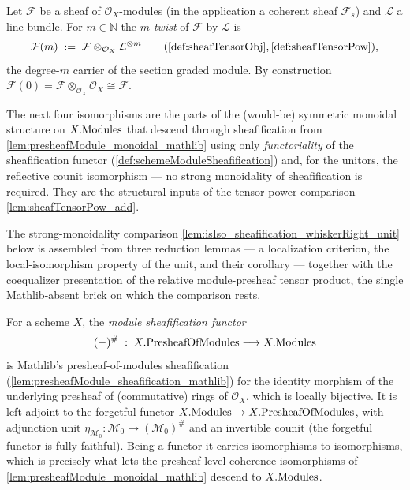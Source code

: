 \begin{definition}
  \label{def:sheafModuleTwist}
  Let \(\mathcal{F}\) be a sheaf of \(\mathcal{O}_X\)-modules (in the application
  a coherent sheaf \(\mathcal{F}_s\)) and \(\mathcal{L}\) a line bundle. For
  \(m \in \mathbb{N}\) the \emph{\(m\)-twist} of \(\mathcal{F}\) by
  \(\mathcal{L}\) is
  \[
    \mathcal{F}(m) \;:=\;
      \mathcal{F} \otimes_{\mathcal{O}_X} \mathcal{L}^{\otimes m}
      \qquad(\cref{def:sheafTensorObj}, \cref{def:sheafTensorPow}),
  \]
  the degree-\(m\) carrier of the section graded module. By construction
  \(\mathcal{F}(0) = \mathcal{F} \otimes_{\mathcal{O}_X} \mathcal{O}_X \cong
  \mathcal{F}\).
\end{definition}


The next four isomorphisms are the parts of the (would-be) symmetric monoidal
structure on \(X.\mathrm{Modules}\) that descend through sheafification from
\cref{lem:presheafModule_monoidal_mathlib} using only \emph{functoriality} of the
sheafification functor (\cref{def:schemeModuleSheafification}) and, for the
unitors, the reflective counit isomorphism --- no strong monoidality of
sheafification is required. They are the structural inputs of the tensor-power
comparison \cref{lem:sheafTensorPow_add}.


The strong-monoidality comparison \cref{lem:isIso_sheafification_whiskerRight_unit}
below is assembled from three reduction lemmas --- a localization criterion, the
local-isomorphism property of the unit, and their corollary --- together with the
coequalizer presentation of the relative module-presheaf tensor product, the single
Mathlib-absent brick on which the comparison rests.


\begin{definition}

  \label{def:schemeModuleSheafification}
  For a scheme \(X\), the \emph{module sheafification functor}
  \[
    (-)^{\#} \;:\; X.\mathrm{PresheafOfModules} \longrightarrow X.\mathrm{Modules}
  \]
  is Mathlib's presheaf-of-modules sheafification
  (\cref{lem:presheafModule_sheafification_mathlib}) for the identity morphism of
  the underlying presheaf of (commutative) rings of \(\mathcal{O}_X\), which is
  locally bijective. It is left adjoint to the forgetful functor
  \(X.\mathrm{Modules} \to X.\mathrm{PresheafOfModules}\), with adjunction unit
  \(\eta_{\mathcal{M}_0} : \mathcal{M}_0 \to (\mathcal{M}_0)^{\#}\) and an
  invertible counit (the forgetful functor is fully faithful). Being a functor it
  carries isomorphisms to isomorphisms, which is precisely what lets the
  presheaf-level coherence isomorphisms of
  \cref{lem:presheafModule_monoidal_mathlib} descend to \(X.\mathrm{Modules}\).
\end{definition}

